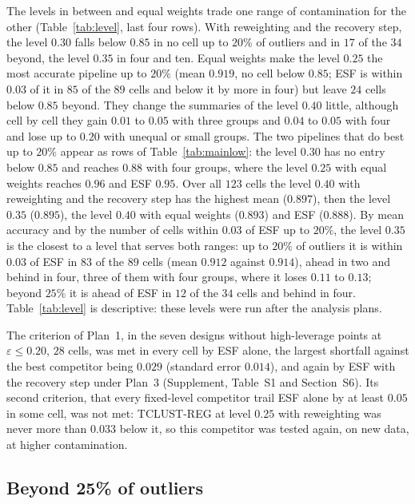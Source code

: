 The levels in between and equal weights trade one range of contamination for the other
(Table~\ref{tab:level}, last four rows). With reweighting and the recovery step, the level
$0.30$ falls below $0.85$ in no cell up to $20\%$ of outliers and in $17$ of the $34$ beyond,
the level $0.35$ in four and ten. Equal weights make the level $0.25$ the most accurate pipeline
up to $20\%$ (mean $0.919$, no cell below $0.85$; ESF is within $0.03$ of it in $85$ of the
$89$ cells and below it by more in four) but leave $24$ cells below $0.85$ beyond. They
change the summaries of the level $0.40$ little, although cell by cell they gain $0.01$ to
$0.05$ with three groups and $0.04$ to $0.05$ with four and lose up to $0.20$ with unequal or small groups. The two
pipelines that do best up to $20\%$ appear as rows of Table~\ref{tab:mainlow}: the level
$0.30$ has no entry below $0.85$ and reaches $0.88$ with four groups, where the level $0.25$
with equal weights reaches $0.96$ and ESF $0.95$. Over all $123$ cells the level $0.40$ with reweighting and the
recovery step has the highest mean ($0.897$), then the level $0.35$ ($0.895$), the level $0.40$
with equal weights ($0.893$) and ESF ($0.888$). By mean accuracy and by the number of cells within $0.03$ of ESF up to $20\%$, the level
$0.35$ is the closest to a level that serves both ranges: up to $20\%$ of outliers it is within $0.03$ of ESF in $83$ of the $89$ cells
(mean $0.912$ against $0.914$), ahead in two and behind in four, three of them with four groups,
where it loses $0.11$ to $0.13$; beyond $25\%$ it is ahead of ESF in $12$ of the $34$ cells and behind in four.
Table~\ref{tab:level} is descriptive: these levels were run after the analysis plans.

The criterion of Plan~1, in the seven designs without high-leverage points at
$\varepsilon\le0.20$, $28$ cells, was met in every cell by ESF alone, the largest shortfall
against the best competitor being $0.029$ (standard error $0.014$), and again by ESF with the
recovery step under Plan~3 (Supplement, Table~S1 and Section~S6). Its second criterion, that every
fixed-level competitor trail ESF alone by at least $0.05$ in some cell, was not met: TCLUST-REG at level
$0.25$ with reweighting was never more than $0.033$ below it, so this competitor was tested
again, on new data, at higher contamination.

\subsection{Beyond 25\% of outliers}
\label{sec:high}

